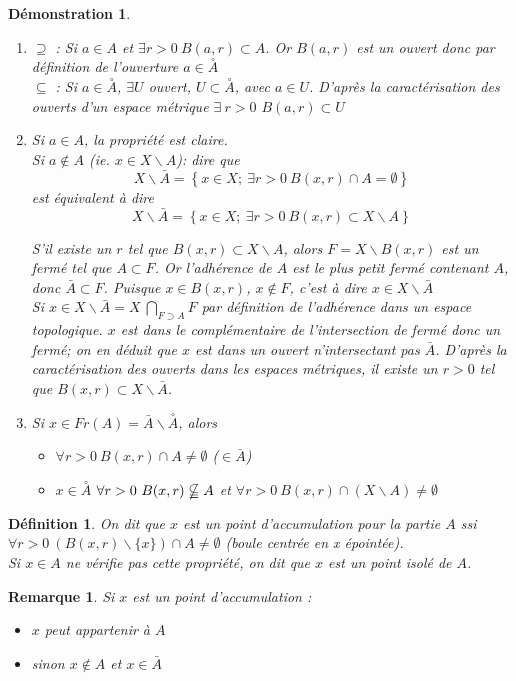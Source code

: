 \documentclass[a4paper, oneside]{report}
\theoremstyle{break}
\newtheorem{defi}[thm]{Définition}
\newtheorem*{demo}{Démonstration}
\newtheorem{remar}[thm]{Remarque}
\newcommand{\cerc}[1]{\overset{\circ}{#1}}
\begin{document}
\begin{demo}
\begin{enumerate}
\item $\supseteq$ : Si $a\in A$ et $\exists r>0~B(a,r)\subset A$. Or $B(a,r)$ est un ouvert donc par définition de l'ouverture $a\in \cerc{A}$\\
$\subseteq$ : Si $a\in \cerc{A}$, $\exists U$ ouvert, $U\subset \cerc{A}$, avec $a\in U$. D'après la caractérisation des ouverts d'un espace métrique $\exists~r>0$ $B(a,r)\subset U$

\item Si $a\in A$, la propriété est claire.\\
  Si $a\notin A$ (ie. $x \in X\backslash A$):
  dire que 
  $$X\backslash \bar{A} = \left\{x\in X;~\exists r>0~ B(x,r) \cap A = \emptyset \right\}$$
  est équivalent à dire
  $$X\backslash \bar{A} = \left\{x\in X;~\exists r>0~ B(x,r) \subset X\backslash A \right\}$$
  
  S'il existe un $r$ tel que $B(x,r)\subset X\backslash A$, alors $F=X\backslash B(x,r)$ est un fermé tel que $A\subset F$. Or l'adhérence de $A$ est le plus petit fermé contenant $A$, donc $\bar{A}\subset F$. Puisque $x\in B(x, r)$, $x\notin F$, c'est à dire $x\in X\backslash \bar{A}$\\
  Si $x\in X\backslash \bar{A}=X\ \bigcap_{F\supset A}F$ par définition de l'adhérence dans un espace topologique. $x$ est dans le complémentaire de l'intersection de fermé donc un fermé; on en déduit que $x$ est dans un ouvert n'intersectant pas $\bar{A}$. D'après la caractérisation des ouverts dans les espaces métriques, il existe un $r>0$ tel que  $B(x, r) \subset X\backslash \bar{A}$.\\
  
\item Si $x\in Fr(A)=\bar{A} \backslash \cerc{A}$, alors 
\begin{itemize}
\item  $\forall r>0~B(x,r)\cap A \neq \emptyset$ ($\in \bar{A}$)
\item $x\in \cerc{A}$ $\forall r>0~B(x,r)\nsubseteqq A$ et $\forall r>0~B(x,r)\cap (X\backslash A)\neq \emptyset$
\end{itemize}

\end{enumerate}
\end{demo}



\begin{defi}                    
On dit que $x$ est un point d'accumulation pour la partie $A$ ssi $\forall r>0~(B(x,r)\backslash \{x\}) \cap A \neq \emptyset$ (boule centrée en x épointée).\\
Si $x\in A$ ne vérifie pas cette propriété, on dit que $x$ est un point isolé de $A$.
\end{defi}
\begin{remar}
Si $x$ est un point d'accumulation :
\begin{itemize}
\item $x$ peut appartenir à $A$
\item sinon $x\notin A$ et $x\in \bar{A}$
\end{itemize}
\end{remar}
\end{document}
